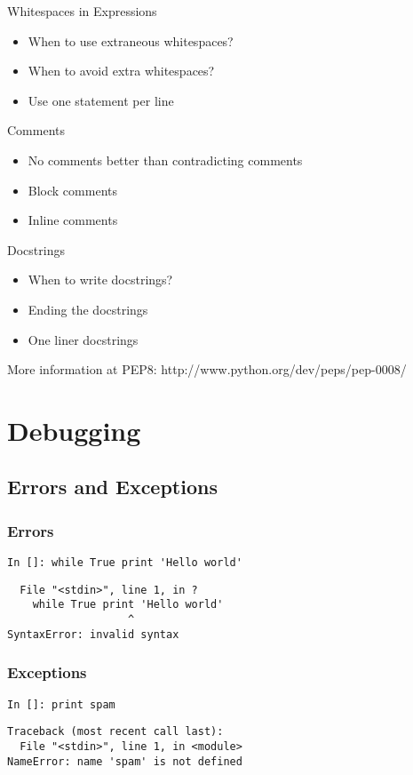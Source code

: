 \documentclass[compress,14pt]{beamer}
\newcounter{time}
\newcommand{\inctime}[1]{\addtocounter{time}{#1}{\vspace*{0.1in}\tiny \thetime\ m}}
\begin{document}
\begin{frame}{Whitespaces in Expressions}
  \begin{itemize}
        \item When to use extraneous whitespaces?
        \item When to avoid extra whitespaces?
        \item Use one statement per line
   \end{itemize}
\end{frame}

\begin{frame}{Comments}
  \begin{itemize}
        \item No comments better than contradicting comments
        \item Block comments
        \item Inline comments
   \end{itemize}
\end{frame}

\begin{frame}{Docstrings}
  \begin{itemize}
        \item When to write docstrings?
        \item Ending the docstrings
        \item One liner docstrings
   \end{itemize}
More information at PEP8: http://www.python.org/dev/peps/pep-0008/
\inctime{5}
\end{frame}

\section{Debugging}
\subsection{Errors and Exceptions}
\begin{frame}[fragile]
 \frametitle{Errors}
 \begin{lstlisting}
In []: while True print 'Hello world'
 \end{lstlisting}
\pause
  \begin{lstlisting}
  File "<stdin>", line 1, in ?
    while True print 'Hello world'
                   ^
SyntaxError: invalid syntax
\end{lstlisting}
\end{frame}

\begin{frame}[fragile]
 \frametitle{Exceptions}
 \begin{lstlisting}
In []: print spam
\end{lstlisting}
\pause
\begin{lstlisting}
Traceback (most recent call last):
  File "<stdin>", line 1, in <module>
NameError: name 'spam' is not defined
\end{lstlisting}
\end{frame}
\end{document}
